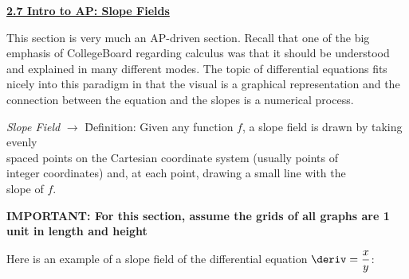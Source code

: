 \textbf{\underline{\large{2.7 Intro to AP: Slope Fields}}} \par

This section is very much an AP-driven section. Recall that one of the big emphasis of CollegeBoard regarding calculus was that it should be understood and explained in many different modes. The topic of differential equations fits nicely into this paradigm in that the visual is a graphical representation and the connection between the equation and the slopes is a numerical process. \par

\begin{tcolorbox}[definition]
    \begin{tabbing}
        \textit{Slope Field} $\rightarrow$ \= Definition: Given any function $f$, a slope field is drawn by taking evenly \\
        \> spaced points on the Cartesian coordinate system (usually points of \\
        \> integer coordinates) and, at each point, drawing a small line with the \\
        \> slope of $f$.
    \end{tabbing}
\end{tcolorbox}

\textbf{IMPORTANT: For this section, assume the grids of all graphs are 1 unit in length and height}

Here is an example of a slope field of the differential equation $\deriv = \dfrac{x}{y}$: \par

